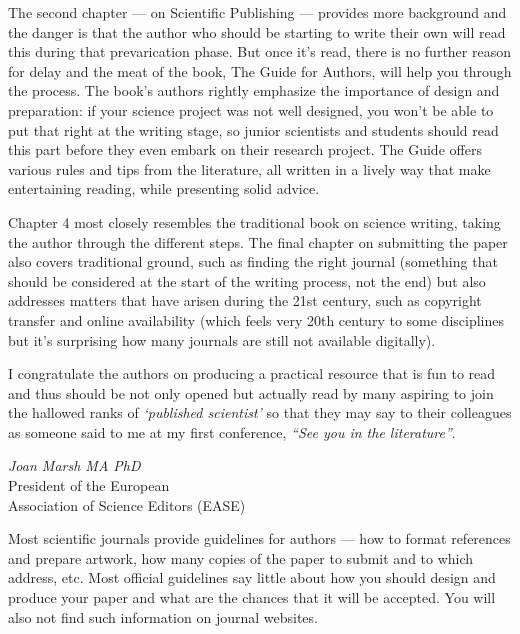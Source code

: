 \documentclass[graybox,envcountchap,sectrefs,UStrade]{svmono}
\begin{document}
The second chapter --- on Scientific Publishing --- provides more background and the danger is that the author who should be starting to write their own will read this during that prevarication phase. But once it's read, there is no further reason for delay and the meat of the book, The Guide for Authors, will help you through the process. The book's authors rightly emphasize the importance of design and preparation: if your science project was not well designed, you won't be able to put that right at the writing stage, so junior scientists and students should read this part before they even embark on their research project. The Guide offers various rules and tips from the literature, all written in a lively way that make entertaining reading, while presenting solid advice.\par

Chapter 4 most closely resembles the traditional book on science writing, taking the author through the different steps. The final chapter on submitting the paper also covers traditional ground, such as finding the right journal (something that should be considered at the start of the writing process, not the end) but also addresses matters that have arisen during the 21st century, such as copyright transfer and online availability (which feels very 20th century to some disciplines but it's surprising how many journals are still not available digitally).\par

I congratulate the authors on producing a practical resource that is fun to read and thus should be not only opened but actually read by many aspiring to join the hallowed ranks of \emph{`published scientist'} so that they may say to their colleagues as someone said to me at my first conference, \emph{``See you in the literature''}.\par

\vspace{\baselineskip}
\begin{flushright}
\noindent \emph{Joan Marsh MA PhD}\\
President of the European  \\
Association of Science Editors (EASE) \hfill \\
\end{flushright}



Most scientific journals provide guidelines for authors --- how to format references and prepare artwork, how many copies of the paper to submit and to which address, etc. Most official guidelines say little about how you should design and produce your paper and what are the chances that it will be accepted. You will also not find such information on journal websites.\par
\end{document}
